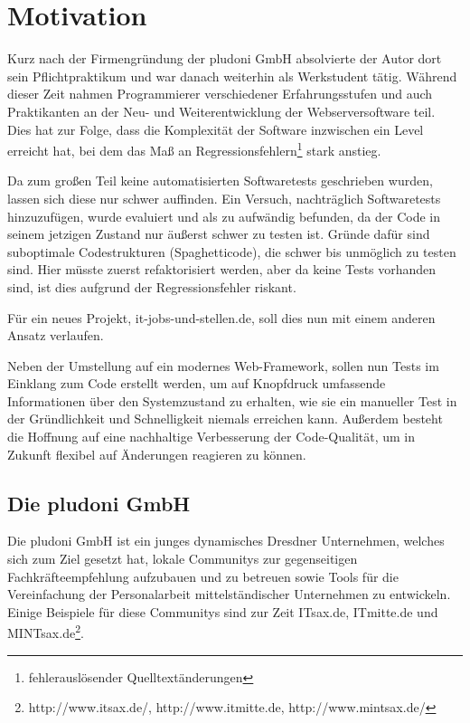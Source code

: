 \section{Motivation}

Kurz nach der Firmengründung der pludoni GmbH absolvierte der Autor dort sein Pflichtpraktikum und war danach weiterhin als Werkstudent tätig.
Während dieser Zeit nahmen Programmierer verschiedener Erfahrungsstufen und auch Praktikanten an der Neu- und Weiterentwicklung der Webserversoftware teil. Dies hat zur Folge, dass die Komplexität der Software inzwischen ein Level erreicht hat, bei dem das Maß an Regressionsfehlern\footnote{fehlerauslösender Quelltextänderungen} stark anstieg.

Da zum großen Teil keine automatisierten Softwaretests geschrieben wurden, lassen sich diese nur schwer auffinden. Ein Versuch, nachträglich Softwaretests hinzuzufügen, wurde evaluiert und als zu aufwändig befunden, da der Code in seinem jetzigen Zustand nur äußerst schwer zu testen ist. Gründe dafür sind suboptimale Codestrukturen (Spaghetticode), die schwer bis unmöglich zu testen sind. Hier müsste zuerst refaktorisiert werden, aber da keine Tests vorhanden sind, ist dies aufgrund der Regressionsfehler riskant. %

Für ein neues Projekt, it-jobs-und-stellen.de, soll dies nun mit einem anderen Ansatz verlaufen.

Neben der Umstellung auf ein modernes Web-Framework, sollen nun Tests im Einklang zum Code erstellt werden, um auf Knopfdruck  umfassende Informationen über den Systemzustand zu erhalten, wie sie ein manueller Test in der Gründlichkeit und Schnelligkeit niemals erreichen kann. Außerdem besteht die Hoffnung auf eine nachhaltige Verbesserung der Code-Qualität, um in Zukunft flexibel auf Änderungen reagieren zu können.


\subsection{Die pludoni GmbH}

Die pludoni GmbH ist ein junges dynamisches Dresdner Unternehmen, welches sich zum Ziel gesetzt hat, lokale Communitys zur gegenseitigen Fachkräfteempfehlung aufzubauen und zu betreuen sowie Tools für die Vereinfachung der Personalarbeit mittelständischer Unternehmen zu entwickeln. Einige Beispiele für diese Communitys sind zur Zeit ITsax.de, ITmitte.de und MINTsax.de\footnote{http://www.itsax.de/, http://www.itmitte.de, http://www.mintsax.de/}.
